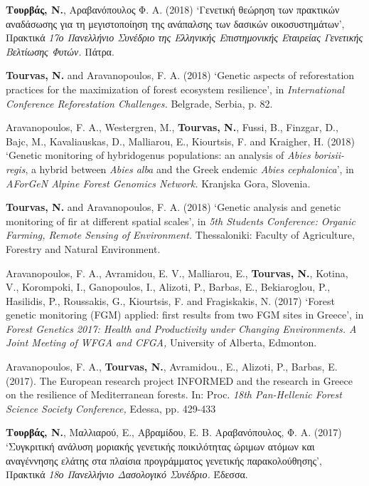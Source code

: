 \documentclass[12pt,]{scrartcl}
\begin{document}
\begin{enumerate}
\item {\textbf{Τουρβάς, Ν.}, Αραβανόπουλος Φ. Α. (2018) ‘Γενετική θεώρηση των πρακτικών αναδάσωσης για τη μεγιστοποίηση της ανάπαλσης των δασικών οικοσυστημάτων’, Πρακτικά \textit{17ο Πανελλήνιο Συνέδριο της Ελληνικής Επιστημονικής Εταιρείας Γενετικής Βελτίωσης Φυτών.} Πάτρα.}

\leftskip-0.07in  
\item {\textbf{Tourvas, N.} and Aravanopoulos, F. A. (2018) ‘Genetic aspects of reforestation practices for the maximization of forest ecosystem resilience’, in \textit{International Conference Reforestation Challenges.} Belgrade, Serbia, p. 82.}

\leftskip-0.07in  
\item {Aravanopoulos, F. A., Westergren, M., \textbf{Tourvas, N.}, Fussi, B., Finzgar, D., Bajc, M., Kavaliauskas, D., Malliarou, E., Kiourtsis, F. and Kraigher, H. (2018) ‘Genetic monitoring of hybridogenus populations: an analysis of \textit{Abies borisii-regis}, a hybrid between \textit{Abies alba }and the Greek endemic \textit{Abies cephalonica}’, in \textit{AForGeN Alpine Forest Genomics Network.} Kranjska Gora, Slovenia.}

\item {\textbf{Tourvas, N.} and Aravanopoulos, F. A. (2018) ‘Genetic analysis and genetic monitoring of fir at different spatial scales’, in \textit{5th Students Conference: Organic Farming, Remote Sensing of Environment.} Thessaloniki: Faculty of Agriculture, Forestry and Natural Environment.

\leftskip-0.07in  
\item {Aravanopoulos, F. A., Avramidou, E. V., Malliarou, E., \textbf{Tourvas, N.}, Kotina, V., Korompoki, I., Ganopoulos, I., Alizoti, P., Barbas, E., Bekiaroglou, P., Hasilidis, P., Roussakis, G., Kiourtsis, F. and Fragiskakis, N. (2017) ‘Forest genetic monitoring (FGM) applied: first results from two FGM sites in Greece’, in \textit{Forest Genetics 2017: Health and Productivity under Changing Environments. A Joint Meeting of WFGA and CFGA,} University of Alberta, Edmonton.}

\leftskip-0.07in  
\item {Aravanopoulos, F. Α., \textbf{Tourvas, N.}, Avramidou., E., Alizoti, P., Barbas, E. (2017). The European research project INFORMED and the research in Greece on the resilience of Mediterranean forests. In: Proc. \textit{18th Pan-Hellenic Forest Science Society Conference,} Edessa, pp. 429-433}
 
\leftskip-0.07in  
\item {\textbf{Τουρβάς, Ν.}, Μαλλιαρού, E., Αβραμίδου, Ε. Β. Αραβανόπουλος, Φ. Α. (2017) ‘Συγκριτική ανάλυση μοριακής γενετικής ποικιλότητας ώριμων ατόμων και αναγέννησης ελάτης στα πλαίσια προγράμματος γενετικής παρακολούθησης’, Πρακτικά \textit{18ο Πανελλήνιο Δασολογικό Συνέδριο.} Έδεσσα.}

}
\end{enumerate}
\end{document}
